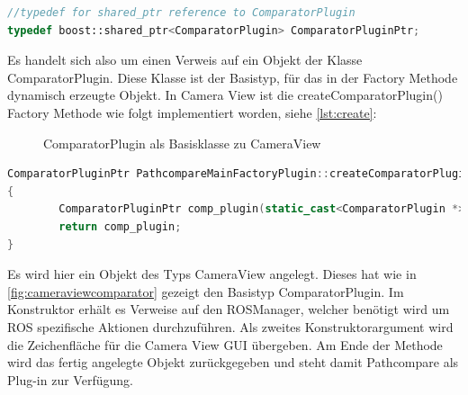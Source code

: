 \begin{lstlisting}[caption=Typdefinition von CompoaratorPluginPtr, language=C++, basicstyle=\footnotesize, label=lst:returntypedef]
//typedef for shared_ptr reference to ComparatorPlugin
typedef boost::shared_ptr<ComparatorPlugin> ComparatorPluginPtr;
\end{lstlisting}

Es handelt sich also um einen Verweis auf ein Objekt der Klasse
ComparatorPlugin. Diese Klasse ist der Basistyp, für das in der Factory Methode
dynamisch erzeugte Objekt. In Camera View ist die createComparatorPlugin()
Factory Methode wie folgt implementiert worden, siehe \autoref{lst:create}:

 \begin{figure}[t]
   \begin{center}
   \end{center}
   \caption{ComparatorPlugin als Basisklasse zu CameraView}
   \label{fig:cameraviewcomparator}
 \end{figure}

\begin{lstlisting}[caption=Implementierung der createComparatorPlugin in Camera View, language=C++, basicstyle=\footnotesize, label=lst:create]
ComparatorPluginPtr PathcompareMainFactoryPlugin::createComparatorPlugin(ROSManager * ros_manager, QWidget *tab_widget) const
{
        ComparatorPluginPtr comp_plugin(static_cast<ComparatorPlugin *>(new CameraView(ros_manager, tab_widget)));
        return comp_plugin;
}
\end{lstlisting}

Es wird hier ein Objekt des Typs CameraView angelegt. Dieses
hat wie in \autoref{fig:cameraviewcomparator} gezeigt den Basistyp ComparatorPlugin. Im
Konstruktor erhält es Verweise auf den ROSManager, welcher benötigt wird um ROS
spezifische Aktionen durchzuführen. Als zweites Konstruktorargument wird die
Zeichenfläche für die Camera View GUI übergeben. Am Ende der Methode wird das
fertig angelegte Objekt zurückgegeben und steht damit Pathcompare als Plug-in zur
Verfügung. 

